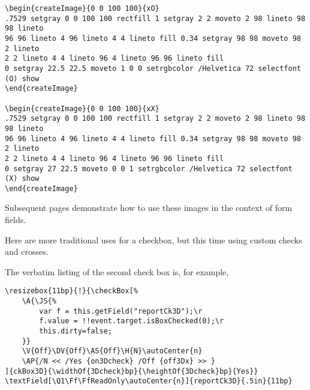 \documentclass{article}
\begin{document}
\begin{scriptsize}
\begin{verbatim}
\begin{createImage}{0 0 100 100}{xO}
.7529 setgray 0 0 100 100 rectfill 1 setgray 2 2 moveto 2 98 lineto 98 98 lineto
96 96 lineto 4 96 lineto 4 4 lineto fill 0.34 setgray 98 98 moveto 98 2 lineto
2 2 lineto 4 4 lineto 96 4 lineto 96 96 lineto fill
0 setgray 22.5 22.5 moveto 1 0 0 setrgbcolor /Helvetica 72 selectfont (O) show
\end{createImage}

\begin{createImage}{0 0 100 100}{xX}
.7529 setgray 0 0 100 100 rectfill 1 setgray 2 2 moveto 2 98 lineto 98 98 lineto
96 96 lineto 4 96 lineto 4 4 lineto fill 0.34 setgray 98 98 moveto 98 2 lineto
2 2 lineto 4 4 lineto 96 4 lineto 96 96 lineto fill
0 setgray 27 22.5 moveto 0 0 1 setrgbcolor /Helvetica 72 selectfont (X) show
\end{createImage}
\end{verbatim}
\end{scriptsize}

Subsequent pages demonstrate how to use these images in the context of form fields.

Here are more traditional uses for a checkbox, but this time using
custom checks and crosses.

\medskip
\noindent\hspace*{20pt}

\smallskip
\noindent\hspace*{20pt}

\medskip The verbatim listing of the second check box is, for example,
\begin{small}
\begin{verbatim}
\resizebox{11bp}{!}{\checkBox[%
    \A{\JS{%
        var f = this.getField("reportCk3D");\r
        f.value = !!event.target.isBoxChecked(0);\r
        this.dirty=false;
    }}
    \V{Off}\DV{Off}\AS{Off}\H{N}\autoCenter{n}
    \AP{/N << /Yes {on3Dcheck} /Off {off3Dx} >> }
]{ckBox3D}{\widthOf{3Dcheck}bp}{\heightOf{3Dcheck}bp}{Yes}}
\textField[\Q1\Ff\FfReadOnly\autoCenter{n}]{reportCk3D}{.5in}{11bp}
\end{verbatim}
\end{small}
\end{document}
